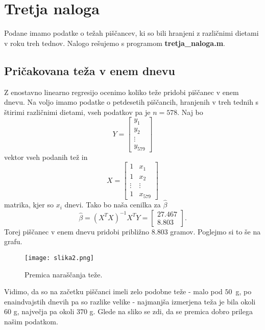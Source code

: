 \documentclass[a4paper,12pt]{article}
\begin{document}
\section{Tretja naloga}
Podane imamo podatke o težah piščancev, ki so bili hranjeni z različnimi dietami v roku treh tednov. Nalogo rešujemo s 
programom \textbf{tretja\_naloga.m}.
\subsection{Pričakovana teža v enem dnevu}
Z enostavno linearno regresijo ocenimo koliko teže pridobi piščanec v enem dnevu. Na voljo imamo podatke o petdesetih piščancih, hranjenih 
v treh tednih s štirimi različnimi dietami, vseh podatkov pa je $n = 578$. Naj bo 
\begin{equation*}
    Y = \begin{bmatrix}
        y_1 \\
        y_2\\
        \vdots \\
        y_{579}
        \end{bmatrix}
\end{equation*}
vektor vseh podanih tež in 
\begin{equation*}
    X = \begin{bmatrix}
        1 & x_1 \\
        1 & x_2\\
        \vdots & \vdots \\
        1 & x_{579}
        \end{bmatrix}
\end{equation*}
matrika, kjer so $x_i$ dnevi. Tako bo naša cenilka za $\widehat{\beta}$
\begin{equation*}
    \widehat{\beta}= \left(X^{T}X\right)^{-1}X^TY
    = \begin{bmatrix}
        27.467  \\
        8.803 
        \end{bmatrix}.
\end{equation*}
Torej piščanec v enem dnevu pridobi približno $8.803$ gramov. Poglejmo si to še na grafu.
\begin{figure}[H]  
	\centering
	\texttt{[image: slika2.png]}
	\caption{Premica naraščanja teže.}
\end{figure}
Vidimo, da so na začetku piščanci imeli zelo podobne teže - malo pod $50$~g, po enaindvajstih dnevih pa so razlike velike - najmanjša 
izmerjena teža je bila okoli $60$ g, največja pa okoli $370$ g. Glede na sliko se zdi, da se premica dobro prilega našim podatkom.
\end{document}
